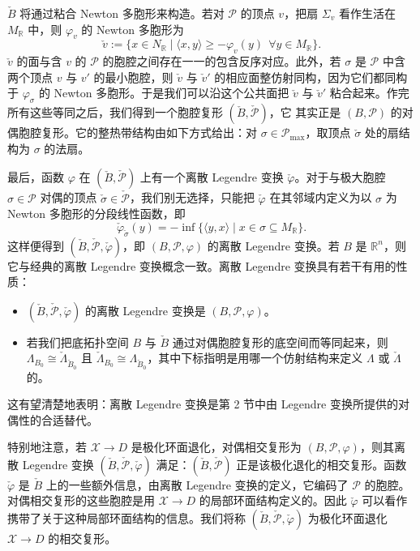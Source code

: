 $\check B$ 将通过粘合 Newton 多胞形来构造。若对 $\mathcal{P}$ 的顶点 $v$，把扇 $\Sigma_v$ 看作生活在 $M_{\mathbb{R}}$ 中，则 $\varphi_v$ 的 Newton 多胞形为
\[
\check v:=\{x\in N_{\mathbb{R}}\mid \langle x,y\rangle\ge-\varphi_v(y)\ \ \forall y\in M_{\mathbb{R}}\}.
\]
$\check v$ 的面与含 $v$ 的 $\mathcal{P}$ 的胞腔之间存在一一的包含反序对应。此外，若 $\sigma$ 是 $\mathcal{P}$ 中含两个顶点 $v$ 与 $v'$ 的最小胞腔，则 $\check v$ 与 $\check v'$ 的相应面整仿射同构，因为它们都同构于 $\varphi_\sigma$ 的 Newton 多胞形。于是我们可以沿这个公共面把 $\check v$ 与 $\check v'$ 粘合起来。作完所有这些等同之后，我们得到一个胞腔复形 $(\check B,\check{\mathcal{P}})$，它
其实正是 $(B,\mathcal{P})$ 的对偶胞腔复形。它的整热带结构由如下方式给出：对 $\sigma\in\mathcal{P}_{\max}$，取顶点 $\check\sigma$ 处的扇结构为 $\sigma$ 的法扇。

最后，函数 $\varphi$ 在 $(\check B,\check{\mathcal{P}})$ 上有一个离散 Legendre 变换 $\check\varphi$。对于与极大胞腔 $\sigma\in\mathcal{P}$ 对偶的顶点 $\check\sigma\in\check{\mathcal{P}}$，我们别无选择，只能把 $\check\varphi$ 在其邻域内定义为以 $\sigma$ 为 Newton 多胞形的分段线性函数，即
\[
\check\varphi_{\check\sigma}(y)=-\inf\{\langle y,x\rangle\mid x\in\sigma\subseteq M_{\mathbb{R}}\}.
\]
这样便得到 $(\check B,\check{\mathcal{P}},\check\varphi)$，即 $(B,\mathcal{P},\varphi)$ 的离散 Legendre 变换。若 $B$ 是 $\mathbb{R}^n$，则它与经典的离散 Legendre 变换概念一致。离散 Legendre 变换具有若干有用的性质：
\begin{itemize}
\item $(\check B,\check{\mathcal{P}},\check\varphi)$ 的离散 Legendre 变换是 $(B,\mathcal{P},\varphi)$。
\item 若我们把底拓扑空间 $B$ 与 $\check B$ 通过对偶胞腔复形的底空间而等同起来，则 $\Lambda_{B_0}\cong\check\Lambda_{\check B_0}$ 且 $\check\Lambda_{B_0}\cong\Lambda_{\check B_0}$，其中下标指明是用哪一个仿射结构来定义 $\Lambda$ 或 $\check\Lambda$ 的。
\end{itemize}

这有望清楚地表明：离散 Legendre 变换是第 2 节中由 Legendre 变换所提供的对偶性的合适替代。

特别地注意，若 $\mathcal{X}\to D$ 是极化环面退化，对偶相交复形为 $(B,\mathcal{P},\varphi)$，则其离散 Legendre 变换 $(\check B,\check{\mathcal{P}},\check\varphi)$ 满足：$(\check B,\check{\mathcal{P}})$ 正是该极化退化的相交复形。函数 $\check\varphi$ 是 $\check B$ 上的一些额外信息，由离散 Legendre 变换的定义，它编码了 $\mathcal{P}$ 的胞腔。对偶相交复形的这些胞腔是用 $\mathcal{X}\to D$ 的局部环面结构定义的。因此 $\check\varphi$ 可以看作携带了关于这种局部环面结构的信息。我们将称 $(\check B,\check{\mathcal{P}},\check\varphi)$ 为极化环面退化 $\mathcal{X}\to D$ 的相交复形。

